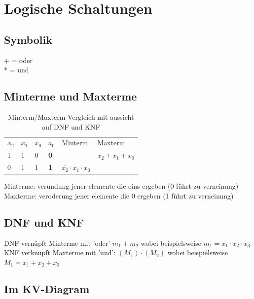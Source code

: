 \documentclass[a4paper]{article}
\begin{document}
\section{Logische Schaltungen}
	\subsection{Symbolik}
		+ = oder\\
		* = und
	\subsection{Minterme und Maxterme}
		\begin{table}[H]
		\centering
		\caption{Minterm/Maxterm Vergleich mit aussicht auf DNF und KNF}
		\label{my-label}
		\begin{tabular}{llllll}
			$x_2$ & $x_1$ & $x_0$ & $a_0$ 	   & Minterm            		  			& Maxterm            							\\
			1    & 1    & 0    & \textbf{0}    &  	&  $\overline{x_2} +  \overline{x_1} +  x_0$	\\
			0    & 1    & 1    & \textbf{1}    &  $\overline{x_2} \cdot x_1 \cdot x_0$	& 
		\end{tabular}
		\end{table}
		Minterme: verundung jener elemente die eins ergeben (0 führt zu verneinung)\\
		Maxterme: veroderung jener elemente die 0 ergeben (1 führt zu verneinung)

		
	\subsection{DNF und KNF}
		DNF vernüpft Minterme mit 'oder' $m_1+m_2$ wobei beispielsweise $m_1 = x_1 \cdot x_2 \cdot x_3$\\
		KNF verknüpft Maxterme mit 'und': $(M_1)\cdot(M_2)$ wobei beispielsweise $M_1 = x_1 + x_2 + x_3$
		
	\subsection{Im KV-Diagram}
\end{document}
